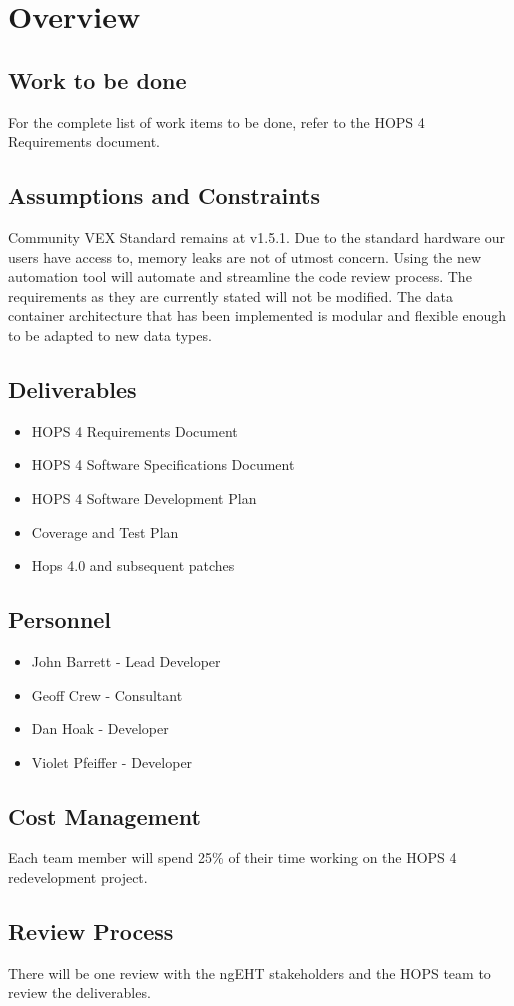 %
%
\section{Overview}
\label{sec:overview}
\subsection{Work to be done}
For the complete list of work items to be done, refer to the HOPS 4 Requirements document.
\subsection{Assumptions and Constraints}
Community VEX Standard remains at v1.5.1.
Due to the standard hardware our users have access to, memory leaks are not of utmost concern. 
Using the new automation tool will automate and streamline the code review process.
The requirements as they are currently stated will not be modified.
The data container architecture that has been implemented is modular and flexible enough to be adapted to new data types.

\subsection{Deliverables}
\begin{itemize}
\item HOPS 4 Requirements Document
\item HOPS 4 Software Specifications Document
\item HOPS 4 Software Development Plan
\item Coverage and Test Plan
\item Hops 4.0 and subsequent patches
\end{itemize}

\subsection{Personnel}
\begin{itemize}
\item John Barrett - Lead Developer
\item Geoff Crew - Consultant
\item Dan Hoak - Developer
\item Violet Pfeiffer - Developer
\end{itemize}

\subsection{Cost Management}
Each team member will spend 25\% of their time working on the HOPS 4 redevelopment project.

\subsection{Review Process}
There will be one review with the ngEHT stakeholders and the HOPS team to review the deliverables.
%
%
